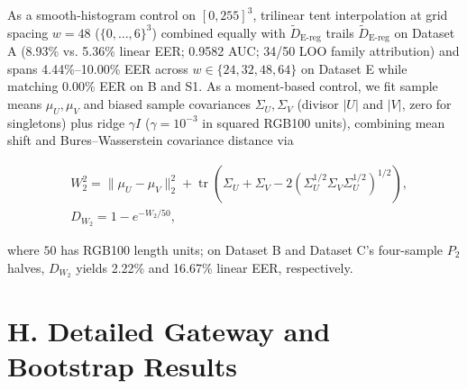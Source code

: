 \documentclass[10pt,letterpaper]{article}
\theoremstyle{definition}
\newcommand{\Dereg}{\tilde D_{\mathrm{E\mbox{-}reg}}}
\newcommand{\DWtwo}{D_{W_2}}
\begin{document}
As a smooth-histogram control on $[0,255]^3$, trilinear tent interpolation at grid spacing $w=48$ ($\{0,\ldots,6\}^3$) combined equally with $\Dereg{}$ trails $\Dereg{}$ on Dataset A (8.93\% vs. 5.36\% linear EER; 0.9582 AUC; 34/50 LOO family attribution) and spans 4.44\%--10.00\% EER across $w\in\{24,32,48,64\}$ on Dataset E while matching 0.00\% EER on B and S1. As a moment-based control, we fit sample means $\mu_U,\mu_V$ and biased sample covariances $\Sigma_U,\Sigma_V$ (divisor $|U|$ and $|V|$, zero for singletons) plus ridge $\gamma I$ ($\gamma=10^{-3}$ in squared RGB100 units), combining mean shift and Bures--Wasserstein covariance distance \cite{ref29} via


\[
\begin{aligned} &W_2^2=\|\mu_U-\mu_V\|_2^2+\operatorname{tr}\!\left(\Sigma_U+\Sigma_V-2(\Sigma_U^{1/2}\Sigma_V\Sigma_U^{1/2})^{1/2}\right), \\ &\DWtwo{}=1-e^{-W_2/50},\end{aligned}
\]

where $50$ has RGB100 length units; on Dataset B and Dataset C's four-sample $P_2$ halves, $\DWtwo{}$ yields 2.22\% and 16.67\% linear EER, respectively.


\section*{H. Detailed Gateway and Bootstrap Results}
\end{document}
